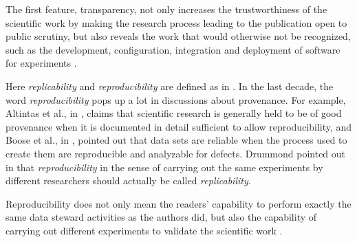 The first feature, transparency, not only increases the trustworthiness of the scientific work by making the research process leading to the publication open to public scrutiny, but also reveals the work that would otherwise not be recognized, such as the development, configuration, integration and deployment of software for experiments \cite{goble2014better}.

Here \emph{replicability} and \emph{reproducibility} are defined as in \cite{drummond2009replicability}. In the last decade, the word \emph{reproducibility} pops up a lot in discussions about provenance. For example, Altintas et al., in \cite{altintas2004kepler}, claims that scientific research is generally held to be of good provenance when it is documented in detail sufficient to allow reproducibility, and Boose et al., in \cite{boose2007ensuring}, pointed out that data sets are reliable when the process used to create them are reproducible and analyzable for defects.  Drummond pointed out in \cite{drummond2009replicability} that \emph{reproducibility} in the sense of carrying out the same experiments by different researchers should actually be called \emph{replicability}. 


Reproducibility does not only mean the readers' capability to perform exactly the same data steward activities as the authors did, but also the capability of carrying out different experiments to validate the scientific work \cite{drummond2009replicability}. 
\cite{goble2014better}



